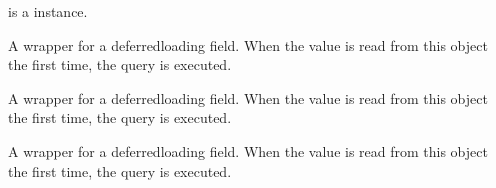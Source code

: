 \documentclass[letterpaper,10pt,french]{sphinxmanual}
\begin{document}
\begin{fulllineitems}
\begin{fulllineitems}
\sphinxAtStartPar
{} is a  instance.

\end{fulllineitems}


\begin{fulllineitems}
\label{\detokenize{main/model:main.models.Personnel.get_sexe_display}}
\pysigstartsignatures
{}
\pysigstopsignatures
\end{fulllineitems}


\begin{fulllineitems}
\label{\detokenize{main/model:main.models.Personnel.id}}
\pysigstartsignatures
{}
\pysigstopsignatures
\sphinxAtStartPar
A wrapper for a deferred\sphinxhyphen{}loading field. When the value is read from this
object the first time, the query is executed.

\end{fulllineitems}


\begin{fulllineitems}
\label{\detokenize{main/model:main.models.Personnel.is_active}}
\pysigstartsignatures
{}
\pysigstopsignatures
\sphinxAtStartPar
A wrapper for a deferred\sphinxhyphen{}loading field. When the value is read from this
object the first time, the query is executed.

\end{fulllineitems}


\begin{fulllineitems}
\label{\detokenize{main/model:main.models.Personnel.lieunaissance}}
\pysigstartsignatures
{}
\pysigstopsignatures
\sphinxAtStartPar
A wrapper for a deferred\sphinxhyphen{}loading field. When the value is read from this
object the first time, the query is executed.


\end{fulllineitems}
\end{fulllineitems}
\end{document}
